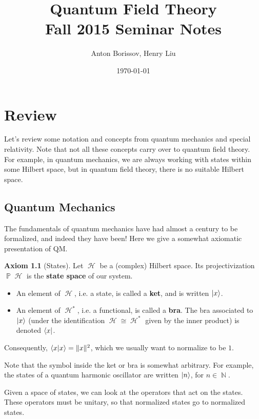 \documentclass{report}
\title{Quantum Field Theory\\Fall 2015 Seminar Notes}
\author{Anton Borissov, Henry Liu}
\date{\today}
\theoremstyle{plain}
\theoremstyle{definition}
\newtheorem{axiom}{Axiom}
\theoremstyle{remark}
\DeclareMathOperator{\bP}{\mathbb{P}}
\DeclareMathOperator{\bN}{\mathbb{N}}
\DeclareMathOperator{\cH}{\mathcal{H}}
\begin{document}
\maketitle

\tableofcontents

\chapter{Review}

Let's review some notation and concepts from quantum mechanics and
special relativity. Note that not all these concepts carry over to
quantum field theory. For example, in quantum mechanics, we are always
working with states within some Hilbert space, but in quantum field
theory, there is no suitable Hilbert space.

\section{Quantum Mechanics}

The fundamentals of quantum mechanics have had almost a century to be
formalized, and indeed they have been! Here we give a somewhat
axiomatic presentation of QM.

\begin{axiom}[States]
  Let $\cH$ be a (complex) Hilbert space. Its projectivization
  $\bP\cH$ is the {\bf state space} of our system.
  \begin{itemize}
  \item An element of $\cH$, i.e. a state, is called a {\bf ket}, and
    is written $\ket{x}$.
  \item An element of $\cH^*$, i.e. a functional, is called a {\bf
      bra}. The bra associated to $\ket{x}$ (under the identification
    $\cH \cong \cH^*$ given by the inner product) is denoted $\bra{x}$.
  \end{itemize}
  Consequently, $\braket{x|x} = \|x\|^2$, which we usually want to
  normalize to be $1$.

  Note that the symbol inside the ket or bra is somewhat arbitrary.
  For example, the states of a quantum harmonic oscillator are written
  $\ket{n}$, for $n \in \bN$.
\end{axiom}

Given a space of states, we can look at the operators that act on the
states. These operators must be unitary, so that normalized states go
to normalized states. 
\end{document}
